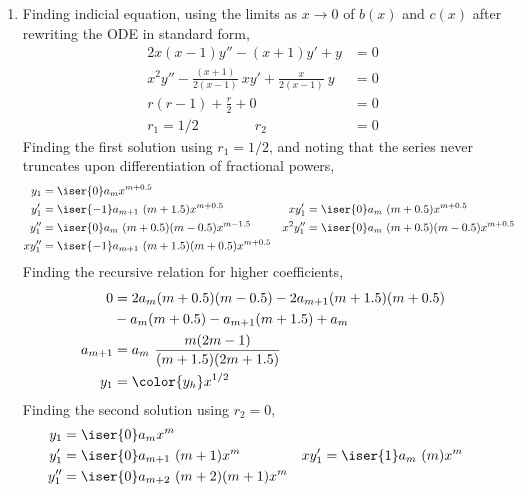 \begin{enumerate}
    \item Finding indicial equation, using the limits as $ x \to 0 $
          of $ b(x) $ and $ c(x) $ after rewriting the ODE in standard form,
          \begin{align}
              2x(x-1)y'' - (x+1)y' + y                                 & = 0 \\
              x^2y'' - \frac{(x+1)}{2(x-1)}\ xy' + \frac{x}{2(x-1)}\ y & = 0 \\
              r(r-1) + \frac{r}{2} + 0                                 & = 0 \\
              r_1 = 1/2 \qquad\qquad r_2                               & = 0
          \end{align}
          Finding the first solution using $ r_1 = 1/2 $, and noting that the series
          never truncates upon differentiation of fractional powers,
          \begin{align}
              y_1       & = \iser{0} a_m x^{m + 0.5}                          \\
              y_1'      & = \iser{-1}a_{m+1}\ (m + 1.5)x^{m+0.5}            &
              xy_1'     & = \iser{0}a_{m}\ (m + 0.5)x^{m+0.5}                 \\
              y_1''     & = \iser{0}a_{m}\ (m + 0.5)(m - 0.5)x^{m - 1.5}    &
              x^2 y_1'' & = \iser{0}a_{m}\ (m + 0.5)(m - 0.5)x^{m + 0.5}      \\
              x y_1''   & = \iser{-1}a_{m+1}\ (m + 1.5)(m + 0.5)x^{m + 0.5}
          \end{align}
          Finding the recursive relation for higher coefficients,
          \begin{align}
              0       & = 2a_m(m+0.5)(m-0.5) - 2a_{m+1}(m+1.5)(m+0.5) \\
                      & - a_m(m+0.5) - a_{m+1}(m+1.5) + a_m           \\
              a_{m+1} & = a_m\ \frac{m(2m-1)}{(m+1.5)(2m+1.5)}        \\
              y_1     & = \color{y_h} x^{1/2}
          \end{align}
          Finding the second solution using $ r_2 = 0 $,
          \begin{align}
              y_1       & = \iser{0} a_m x^m                   \\
              y_1'      & = \iser{0}a_{m+1}\ (m+1)x^{m}      &
              xy_1'     & = \iser{1}a_{m}\ (m)x^{m}            \\
              y_1''     & = \iser{0}a_{m+2}\ (m+2)(m+1)x^{m} &

\end{align}
\end{enumerate}
